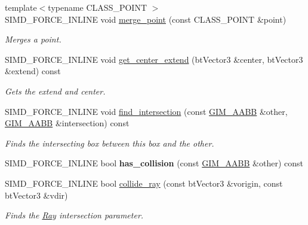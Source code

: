 \begin{DoxyCompactItemize}
{\footnotesize template$<$typename C\+L\+A\+S\+S\+\_\+\+P\+O\+I\+NT $>$ }\\S\+I\+M\+D\+\_\+\+F\+O\+R\+C\+E\+\_\+\+I\+N\+L\+I\+NE void \hyperlink{classGIM__AABB_a982f35ef44698918555a84419f0bbabf}{merge\+\_\+point} (const C\+L\+A\+S\+S\+\_\+\+P\+O\+I\+NT \&point)
\begin{DoxyCompactList}\small\item\em Merges a point. \end{DoxyCompactList}\item 
\mbox{\label{classGIM__AABB_ae618503bf46d8ddee2ea78e252617c71}} 
S\+I\+M\+D\+\_\+\+F\+O\+R\+C\+E\+\_\+\+I\+N\+L\+I\+NE void \hyperlink{classGIM__AABB_ae618503bf46d8ddee2ea78e252617c71}{get\+\_\+center\+\_\+extend} (bt\+Vector3 \&center, bt\+Vector3 \&extend) const
\begin{DoxyCompactList}\small\item\em Gets the extend and center. \end{DoxyCompactList}\item 
\mbox{\label{classGIM__AABB_add403806d9332e67d501fc439a429848}} 
S\+I\+M\+D\+\_\+\+F\+O\+R\+C\+E\+\_\+\+I\+N\+L\+I\+NE void \hyperlink{classGIM__AABB_add403806d9332e67d501fc439a429848}{find\+\_\+intersection} (const \hyperlink{classGIM__AABB}{G\+I\+M\+\_\+\+A\+A\+BB} \&other, \hyperlink{classGIM__AABB}{G\+I\+M\+\_\+\+A\+A\+BB} \&intersection) const
\begin{DoxyCompactList}\small\item\em Finds the intersecting box between this box and the other. \end{DoxyCompactList}\item 
\mbox{\label{classGIM__AABB_a68ac57bfd8a5481b04e0c31454fb4d45}} 
S\+I\+M\+D\+\_\+\+F\+O\+R\+C\+E\+\_\+\+I\+N\+L\+I\+NE bool {\bfseries has\+\_\+collision} (const \hyperlink{classGIM__AABB}{G\+I\+M\+\_\+\+A\+A\+BB} \&other) const
\item 
S\+I\+M\+D\+\_\+\+F\+O\+R\+C\+E\+\_\+\+I\+N\+L\+I\+NE bool \hyperlink{classGIM__AABB_a1fafc37703d288fd0fe862b861829287}{collide\+\_\+ray} (const bt\+Vector3 \&vorigin, const bt\+Vector3 \&vdir)
\begin{DoxyCompactList}\small\item\em Finds the \hyperlink{classRay}{Ray} intersection parameter. \end{DoxyCompactList}\item 

\end{DoxyCompactItemize}
